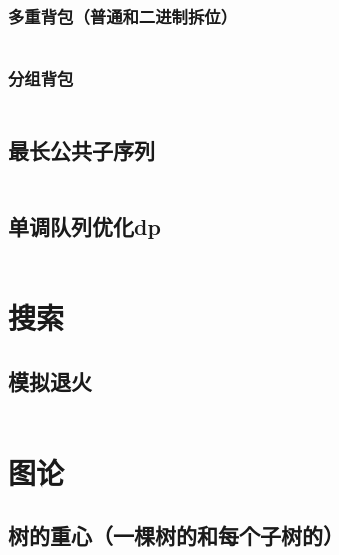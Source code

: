 \documentclass[a4paper,11pt]{article}
\begin{document}
\subsubsection{多重背包（普通和二进制拆位）} %
\inputminted[breaklines]{c++}{经典动态规划/多重背包.cpp}
\subsubsection{分组背包} %
\inputminted[breaklines]{c++}{经典动态规划/分组背包.cpp}
\subsection{最长公共子序列} %
\inputminted[breaklines]{c++}{经典动态规划/最长公共子序列.cpp}
\subsection{单调队列优化dp} %
\inputminted[breaklines]{c++}{经典动态规划/单调队列优化dp.cpp}

\newpage
\section{搜索} %
\subsection{模拟退火} %
\inputminted[breaklines]{c++}{搜索/模拟退火.cpp}

\newpage
\section{图论} %
\subsection{树的重心（一棵树的和每个子树的）}
\inputminted[breaklines]{c++}{图论/树的重心.cpp}
\end{document}
